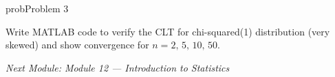\begin{PSbox}[unbreakable]{prob}{Problem 3}

Write MATLAB code to verify the CLT for chi-squared(1) distribution (very skewed) and show convergence for $n = 2,\,5,\,10,\,50$.

\PSsolution{} 


\begin{Shaded}
\begin{Highlighting}[]
 \OperatorTok{=} \OperatorTok{;}  \OperatorTok{=}\NormalTok{ [}   \NormalTok{]}\OperatorTok{;}
\OperatorTok{;}
  \OperatorTok{=} \OperatorTok{:}
     \OperatorTok{=} \NormalTok{(}\NormalTok{(}\OperatorTok{,} \NormalTok{(}\NormalTok{)}\OperatorTok{,} \NormalTok{)}\OperatorTok{,} \NormalTok{)}\OperatorTok{;}
    \NormalTok{(}\OperatorTok{,}\OperatorTok{,}\NormalTok{)}\OperatorTok{;}
    \NormalTok{(}\OperatorTok{,} \OperatorTok{,} \OperatorTok{,} \NormalTok{)}\OperatorTok{;}  \OperatorTok{;}
     \OperatorTok{=} \NormalTok{(}\OperatorTok{,} \OperatorTok{,} \NormalTok{)}\OperatorTok{;}
    \NormalTok{(}\OperatorTok{,} \NormalTok{(}\OperatorTok{,} \OperatorTok{,} \NormalTok{(}\OperatorTok{/}\NormalTok{(}\NormalTok{)))}\OperatorTok{,} \OperatorTok{,} \OperatorTok{,} \NormalTok{)}\OperatorTok{;}
    \NormalTok{(}\NormalTok{(}\OperatorTok{,} \NormalTok{(}\NormalTok{)))}\OperatorTok{;}
\NormalTok{(}\NormalTok{)}\OperatorTok{;}
\end{Highlighting}
\end{Shaded}

\emph{Next Module: {Module 12 — Introduction to Statistics}}

\end{PSbox}
